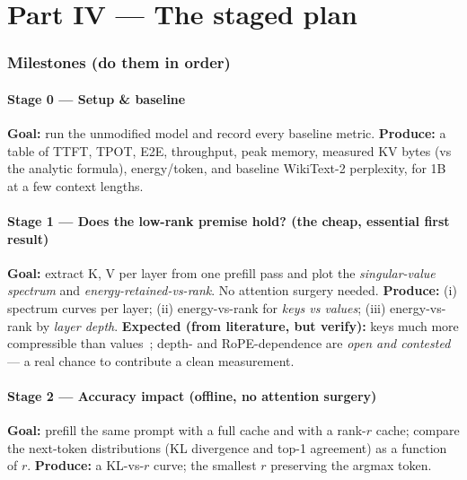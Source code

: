 \documentclass[11pt]{article}
\begin{document}
\part*{Part IV \;---\; The staged plan}

\section{Milestones (do them in order)}

\subsection*{Stage 0 --- Setup \& baseline}
\begin{goalbox}
\textbf{Goal:} run the unmodified model and record every baseline metric. \textbf{Produce:} a
table of TTFT, TPOT, E2E, throughput, peak memory, measured KV bytes (vs the analytic formula),
energy/token, and baseline WikiText-2 perplexity, for 1B at a few context lengths.
\end{goalbox}

\subsection*{Stage 1 --- Does the low-rank premise hold? (the cheap, essential first result)}
\begin{goalbox}
\textbf{Goal:} extract K, V per layer from one prefill pass and plot the \emph{singular-value
spectrum} and \emph{energy-retained-vs-rank}. No attention surgery needed. \textbf{Produce:}
(i) spectrum curves per layer; (ii) energy-vs-rank for \emph{keys vs values}; (iii)
energy-vs-rank by \emph{layer depth}. \textbf{Expected (from literature, but verify):} keys much
more compressible than values~\cite{shadowkv}; depth- and RoPE-dependence are \emph{open and
contested}~\cite{shadowkv,lorc} --- a real chance to contribute a clean measurement.
\end{goalbox}

\subsection*{Stage 2 --- Accuracy impact (offline, no attention surgery)}
\begin{goalbox}
\textbf{Goal:} prefill the same prompt with a full cache and with a rank-$r$ cache; compare the
next-token distributions (KL divergence and top-1 agreement) as a function of $r$.
\textbf{Produce:} a KL-vs-$r$ curve; the smallest $r$ preserving the argmax token.
\end{goalbox}
\end{document}
